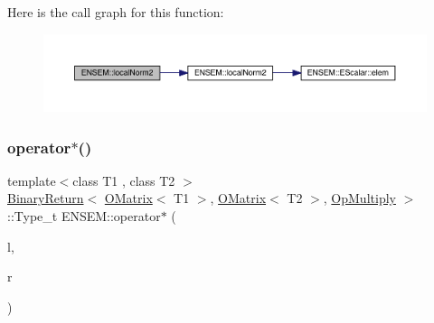 Here is the call graph for this function\+:\nopagebreak
\begin{figure}[H]
\begin{center}
\leavevmode
\includegraphics[width=350pt]{d8/d55/group__obsmatrix_ga13d075f8a50ffa95c7a8a7fa61fe8028_cgraph}
\end{center}
\end{figure}
\mbox{\label{group__obsmatrix_ga7c6a61b10289159298bd053adf13f1a6}} 
\subsubsection{\texorpdfstring{operator$\ast$()}{operator*()}\hspace{0.1cm}{\footnotesize\ttfamily [1/3]}}
{\footnotesize\ttfamily template$<$class T1 , class T2 $>$ \\
\mbox{\hyperlink{structENSEM_1_1BinaryReturn}{Binary\+Return}}$<$ \mbox{\hyperlink{classENSEM_1_1OMatrix}{O\+Matrix}}$<$ T1 $>$, \mbox{\hyperlink{classENSEM_1_1OMatrix}{O\+Matrix}}$<$ T2 $>$, \mbox{\hyperlink{structENSEM_1_1OpMultiply}{Op\+Multiply}} $>$\+::Type\+\_\+t E\+N\+S\+E\+M\+::operator$\ast$ (\begin{DoxyParamCaption}\item[{const \mbox{\hyperlink{classENSEM_1_1OMatrix}{O\+Matrix}}$<$ T1 $>$ \&}]{l,  }\item[{const \mbox{\hyperlink{classENSEM_1_1OMatrix}{O\+Matrix}}$<$ T2 $>$ \&}]{r }\end{DoxyParamCaption})\hspace{0.3cm}{\ttfamily [inline]}}

\mbox{\label{group__obsmatrix_gaf5ede60943f488e0a637504e6838529e}} 
